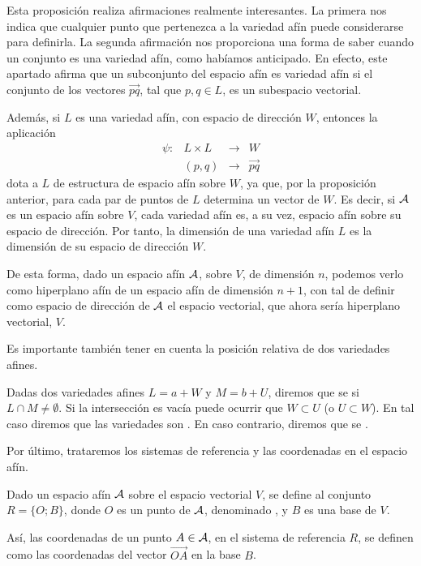 Esta proposición realiza afirmaciones realmente interesantes. La primera nos indica que cualquier punto que pertenezca a la variedad afín puede considerarse para definirla. La segunda afirmación nos proporciona una forma de saber cuando un conjunto es una variedad afín, como habíamos anticipado. En efecto, este apartado afirma que un subconjunto del espacio afín es variedad afín si el conjunto de los vectores $\overrightarrow{pq}$, tal que $p,q\in L$, es un subespacio vectorial.

Además, si $L$ es una variedad afín, con espacio de dirección $W$, entonces la aplicación
\begin{equation*}
\begin{array}{cccc}
\psi: & L \times L & \rightarrow &W\\
& (p,q) & \rightarrow & \overrightarrow{pq}
\end{array}
\end{equation*}
dota a $L$ de estructura de espacio afín sobre $W$, ya que, por la proposición anterior, para cada par de puntos de $L$ determina un vector de $W$. Es decir, si $\mathcal{A}$ es un espacio afín sobre $V$, cada variedad afín es, a su vez, espacio afín sobre su espacio de dirección. Por tanto, la dimensión de una variedad afín $L$ es la dimensión de su espacio de dirección $W$.

De esta forma, dado un espacio afín $\mathcal{A}$, sobre $V$, de dimensión $n$, podemos verlo como hiperplano afín de un espacio afín de dimensión $n+1$, con tal de definir como espacio de dirección de $\mathcal{A}$ el espacio vectorial, que ahora sería hiperplano vectorial, $V$.

Es importante también tener en cuenta la posición relativa de dos variedades afines.
\begin{defi}
	Dadas dos variedades afines $L=a+W$ y $M=b+U$, diremos que se  si $L\cap M\not=\emptyset$. Si la intersección es vacía puede ocurrir que $W\subset U$ (o $U\subset W$). En tal caso diremos que las variedades son . En caso contrario, diremos que se .
\end{defi}

Por último, trataremos los sistemas de referencia y las coordenadas en el espacio afín.
\begin{defi}
	Dado un espacio afín $\mathcal{A}$ sobre el espacio vectorial $V$, se define  al conjunto $R=\{O; B\}$, donde $O$ es un punto de $\mathcal{A}$, denominado , y $B$ es una base de $V$.
\end{defi}
Así, las coordenadas de un punto $A\in\mathcal{A}$, en el sistema de referencia $R$, se definen como las coordenadas del vector $\overrightarrow{OA}$ en la base $B$.

